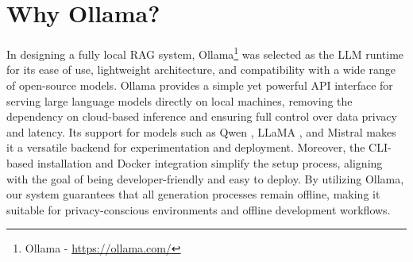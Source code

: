 %

\section{Why Ollama?}

In designing a fully local RAG system, Ollama\footnote{Ollama - \url{https://ollama.com/}} was selected as the LLM runtime for its ease of use, lightweight architecture, and compatibility with a wide range of open-source models. Ollama provides a simple yet powerful API interface for serving large language models directly on local machines, removing the dependency on cloud-based inference and ensuring full control over data privacy and latency. Its support for models such as Qwen \cite{bai2023qwen}, LLaMA \cite{llama}, and Mistral \cite{mistral} makes it a versatile backend for experimentation and deployment. Moreover, the CLI-based installation and Docker integration simplify the setup process, aligning with the goal of being developer-friendly and easy to deploy. By utilizing Ollama, our system guarantees that all generation processes remain offline, making it suitable for privacy-conscious environments and offline development workflows.

\vspace{0.5em}
